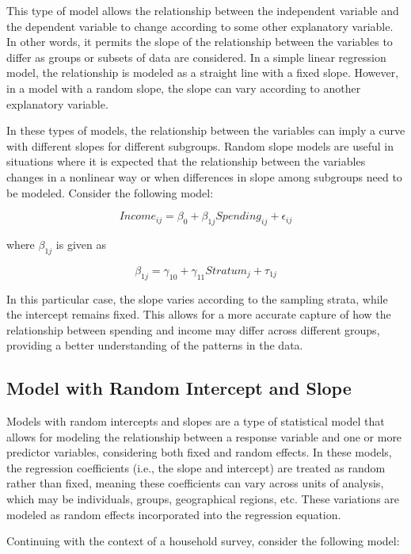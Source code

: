 \documentclass[
  12pt,
]{book}
\begin{document}
This type of model allows the relationship between the independent variable and the dependent variable to change according to some other explanatory variable. In other words, it permits the slope of the relationship between the variables to differ as groups or subsets of data are considered. In a simple linear regression model, the relationship is modeled as a straight line with a fixed slope. However, in a model with a random slope, the slope can vary according to another explanatory variable.

In these types of models, the relationship between the variables can imply a curve with different slopes for different subgroups. Random slope models are useful in situations where it is expected that the relationship between the variables changes in a nonlinear way or when differences in slope among subgroups need to be modeled. Consider the following model:

\[
Income_{ij} = \beta_{0} + \beta_{1j} Spending_{ij} + \epsilon_{ij}
\]

where \(\beta_{1j}\) is given as

\[
\beta_{1j} = \gamma_{10} + \gamma_{11} Stratum_{j} + \tau_{1j}
\]

In this particular case, the slope varies according to the sampling strata, while the intercept remains fixed. This allows for a more accurate capture of how the relationship between spending and income may differ across different groups, providing a better understanding of the patterns in the data.

\hypertarget{model-with-random-intercept-and-slope}{%
\subsection{Model with Random Intercept and Slope}\label{model-with-random-intercept-and-slope}}

Models with random intercepts and slopes are a type of statistical model that allows for modeling the relationship between a response variable and one or more predictor variables, considering both fixed and random effects. In these models, the regression coefficients (i.e., the slope and intercept) are treated as random rather than fixed, meaning these coefficients can vary across units of analysis, which may be individuals, groups, geographical regions, etc. These variations are modeled as random effects incorporated into the regression equation.

Continuing with the context of a household survey, consider the following model:
\end{document}
